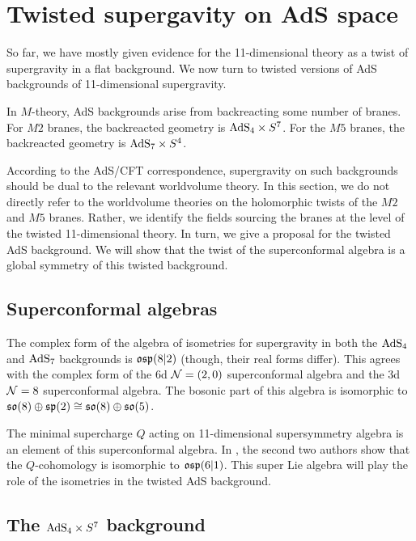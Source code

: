 \section{Twisted supergavity on AdS space}
\label{sec:ads}

So far, we have mostly given evidence for the 11-dimensional theory as a twist of supergravity in a flat background. 
We now turn to twisted versions of AdS backgrounds of 11-dimensional supergravity. 

In $M$-theory, AdS backgrounds arise from backreacting some number of branes. 
For $M2$ branes, the backreacted geometry is ${\rm AdS}_4 \times S^7$.
For the $M5$ branes, the backreacted geometry is ${\rm AdS}_7 \times S^4$. 

According to the AdS/CFT correspondence, supergravity on such backgrounds should be dual to the relevant worldvolume theory. 
In this section, we do not directly refer to the worldvolume theories on the holomorphic twists of the $M2$ and $M5$ branes.
Rather, we identify the fields sourcing the branes at the level of the twisted 11-dimensional theory.
In turn, we give a proposal for the twisted AdS background. 
We will show that the twist of the superconformal algebra is a global symmetry of this twisted background. 

\subsection{Superconformal algebras}

The complex form of the algebra of isometries for supergravity in both the ${\rm AdS}_4$ and ${\rm AdS}_7$ backgrounds is $\mathfrak{osp}(8|2)$ (though, their real forms differ). 
This agrees with the complex form of the 6d $\mathcal N=(2,0)$ superconformal algebra and the 3d $\mathcal N=8$ superconformal algebra. 
The bosonic part of this algebra is isomorphic to $\mathfrak{so}(8) \oplus \mathfrak{sp}(2) \cong \mathfrak{so}(8) \oplus \mathfrak{so}(5)$. 

The minimal supercharge $Q$ acting on 11-dimensional supersymmetry algebra is an element of this superconformal algebra. 
In \cite{SWsuco2}, the second two authors show that the $Q$-cohomology is isomorphic to $\mathfrak{osp}(6|1)$. 
This super Lie algebra will play the role of the isometries in the twisted AdS background. 

\subsection{The ${\rm AdS}_4 \times S^7$ background}

